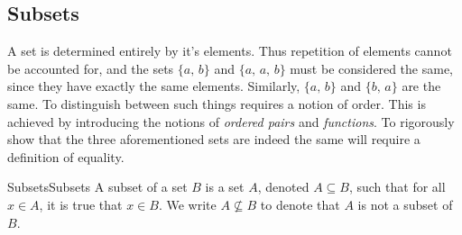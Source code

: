     \subsection{Subsets}
        A set is determined entirely by it's elements. Thus repetition of
        elements cannot be accounted for, and the sets $\{a,\,b\}$ and
        $\{a,\,a,\,b\}$ must be considered the same, since they have exactly
        the same elements. Similarly, $\{a,\,b\}$ and $\{b,\,a\}$ are the
        same. To distinguish between such things requires a notion of order.
        This is achieved by introducing the notions of \textit{ordered pairs}
        and \textit{functions}. To rigorously show that the three
        aforementioned sets are indeed the same will require a definition of
        equality.
        \begin{fdefinition}{Subsets}{Subsets}
            A \gls{subset} of a set $B$ is a set $A$, denoted $A\subseteq{B}$,
            such that for all $x\in{A}$, it is true that $x\in{B}$. We write
            $A\nsubseteq{B}$ to denote that $A$ is not a subset of $B$.
        \end{fdefinition}
